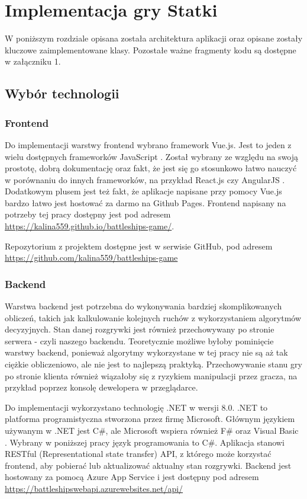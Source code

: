 

\newpage %
\section{Implementacja gry Statki}

W poniższym rozdziale opisana została architektura aplikacji oraz opisane zostały kluczowe zaimplementowane klasy. Pozostałe ważne fragmenty kodu są dostępne w załączniku 1.

\subsection{Wybór technologii}

\subsubsection{Frontend}

 Do implementacji warstwy frontend wybrano framework Vue.js. Jest to jeden z wielu dostępnych frameworków JavaScript \cite{vuejs}. Został wybrany ze względu na swoją prostotę, dobrą dokumentację oraz fakt, że jest się go stosunkowo łatwo nauczyć w porównaniu do innych frameworków, na przykład React.js czy AngularJS \cite{whyChooseVue}.
Dodatkowym plusem jest też fakt, że aplikacje napisane przy pomocy Vue.js bardzo łatwo jest hostować za darmo na Github Pages. Frontend napisany na potrzeby tej pracy dostępny jest pod adresem \url{https://kalina559.github.io/battleships-game/}.

Repozytorium z projektem dostępne jest w serwisie GitHub, pod adresem \url{https://github.com/kalina559/battleships-game}
\subsubsection{Backend}

Warstwa backend jest potrzebna do wykonywania bardziej skomplikowanych obliczeń, takich jak kalkulowanie kolejnych ruchów z wykorzystaniem algorytmów decyzyjnych. Stan danej rozgrywki jest również przechowywany po stronie serwera - czyli naszego backendu. Teoretycznie możliwe byłoby pominięcie warstwy backend, ponieważ algorytmy wykorzystane w tej pracy nie są aż tak ciężkie obliczeniowo, ale nie jest to najlepszą praktyką. Przechowywanie stanu gry po stronie klienta również wiązałoby się z ryzykiem manipulacji przez gracza, na przykład poprzez konsolę dewelopera w przeglądarce.

Do implementacji wykorzystano technologię .NET w wersji 8.0. .NET to platforma programistyczna stworzona przez firmę Microsoft. Głównym językiem używanym w .NET jest C\#, ale Microsoft wspiera również F\# oraz Visual Basic \cite{whatisdotnet} \cite{dotnetlanguages}. Wybrany w poniższej pracy język programowania to C\#. Aplikacja stanowi RESTful (Representational state transfer) API, z którego może korzystać frontend, aby pobierać lub aktualizować aktualny stan rozgrywki. Backend jest hostowany za pomocą Azure App Service i jest dostępny pod adresem \url{https://battleshipswebapi.azurewebsites.net/api/}

